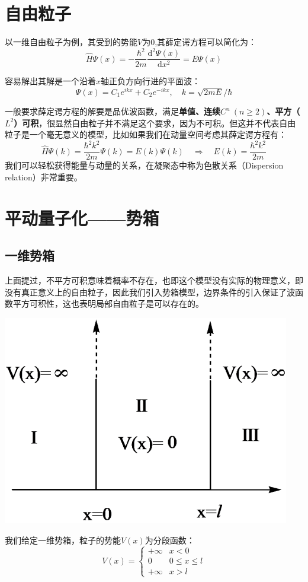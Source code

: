 \section{自由粒子}
以一维自由粒子为例，其受到的势能$V$为0,其薛定谔方程可以简化为：
\[\hat{H}\varPsi(x)=-\frac{\hbar^2}{2m}\frac{\mathrm{d}^2\varPsi(x)}{\mathrm{d}x^2}=E\varPsi(x)\]

容易解出其解是一个沿着$x$轴正负方向行进的平面波：
\[\varPsi(x)=C_1e^{ikx}+C_2e^{-ikx}, \quad k=\sqrt{2mE}/\hbar\]

一般要求薛定谔方程的解要是品优波函数，满足\textbf{单值、连续$C^n \ (n \geq 2)$、平方（$L^2$）可积}，很显然自由粒子并不满足这个要求，因为不可积。但这并不代表自由粒子是一个毫无意义的模型，比如如果我们在动量空间考虑其薛定谔方程有：
\[\hat{H}\varPsi(k)=\frac{\hbar^2k^2}{2m}\varPsi(k)=E(k)\varPsi(k) \quad \Rightarrow \quad E(k)=\frac{\hbar^2k^2}{2m}\]
我们可以轻松获得能量与动量的关系，在凝聚态中称为色散关系（Dispersion relation）非常重要。
\section{平动量子化——势箱}
\subsection{一维势箱}
上面提过，不平方可积意味着概率不存在，也即这个模型没有实际的物理意义，即没有真正意义上的自由粒子，因此我们引入势箱模型，边界条件的引入保证了波函数平方可积性，这也表明局部自由粒子是可以存在的。
\begin{center}
    \includegraphics[scale=0.5]{fig/lzhx/微信图片_20211025092646.png}
\end{center}
我们给定一维势箱，粒子的势能$V(x)$为分段函数：
\[V(x)=\left \{
\begin{array}{rl}
+\infty & x<0\\
0 & 0 \leq x \leq l\\
+\infty & x>l
\end{array} \right .\]

